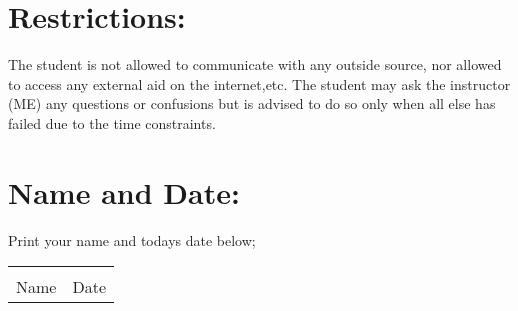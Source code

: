 \documentclass[12pt]{article} %
\begin{document}
	\section{Restrictions:}
	The student is not allowed to communicate with any outside source, nor allowed to access any external aid on the internet,etc. The student may ask the instructor (ME) any questions or confusions but is advised to do so only when all else has failed due to the time constraints.
	\section{Name and Date:}
	Print your name and todays date below;\\


	\begin{center}
	\noindent\begin{tabular}{ll}
		\makebox[3in]{\hrulefill} & \makebox[3in]{\hrulefill}\\
		Name & Date\\[8ex]%
	\end{tabular}
	\end{center}
	\newpage
\end{document}
